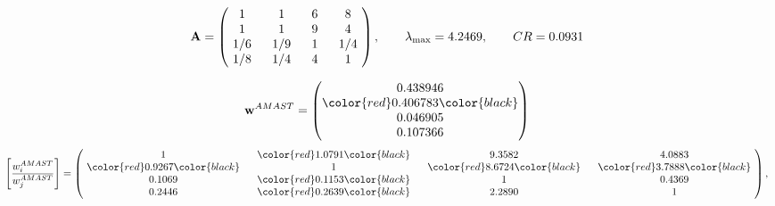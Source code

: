\begin{example}
\begin{equation*}
\mathbf{A} =
\begin{pmatrix}
$\,\,$ 1 $\,\,$ & $\,\,$1$\,\,$ & $\,\,$6$\,\,$ & $\,\,$8 $\,\,$ \\
$\,\,$ 1 $\,\,$ & $\,\,$ 1 $\,\,$ & $\,\,$9$\,\,$ & $\,\,$4 $\,\,$ \\
$\,\,$ 1/6$\,\,$ & $\,\,$ 1/9$\,\,$ & $\,\,$ 1 $\,\,$ & $\,\,$ 1/4 $\,\,$ \\
$\,\,$ 1/8$\,\,$ & $\,\,$ 1/4$\,\,$ & $\,\,$4$\,\,$ & $\,\,$ 1  $\,\,$ \\
\end{pmatrix},
\qquad
\lambda_{\max} =
4.2469,
\qquad
CR = 0.0931
\end{equation*}

\begin{equation*}
\mathbf{w}^{AMAST} =
\begin{pmatrix}
0.438946\\
\color{red} 0.406783\color{black} \\
0.046905\\
0.107366
\end{pmatrix}\end{equation*}
\begin{equation*}
\left[ \frac{{w}^{AMAST}_i}{{w}^{AMAST}_j} \right] =
\begin{pmatrix}
$\,\,$ 1 $\,\,$ & $\,\,$\color{red} 1.0791\color{black} $\,\,$ & $\,\,$9.3582$\,\,$ & $\,\,$4.0883$\,\,$ \\
$\,\,$\color{red} 0.9267\color{black} $\,\,$ & $\,\,$ 1 $\,\,$ & $\,\,$\color{red} 8.6724\color{black} $\,\,$ & $\,\,$\color{red} 3.7888\color{black}   $\,\,$ \\
$\,\,$0.1069$\,\,$ & $\,\,$\color{red} 0.1153\color{black} $\,\,$ & $\,\,$ 1 $\,\,$ & $\,\,$0.4369 $\,\,$ \\
$\,\,$0.2446$\,\,$ & $\,\,$\color{red} 0.2639\color{black} $\,\,$ & $\,\,$2.2890$\,\,$ & $\,\,$ 1  $\,\,$ \\
\end{pmatrix},
\end{equation*}


\end{example}
